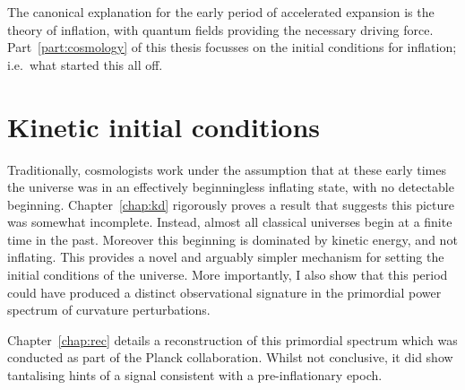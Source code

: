 The canonical explanation for the early period of accelerated expansion is the theory of inflation, with quantum fields providing the necessary driving force. Part~\ref{part:cosmology} of this thesis focusses on the initial conditions for inflation; i.e.\ what started this all off.

\section{Kinetic initial conditions}

Traditionally, cosmologists work under the assumption that at these early times the universe was in an effectively beginningless inflating state, with no detectable beginning. Chapter~\ref{chap:kd} rigorously proves a result that suggests this picture was somewhat incomplete.  Instead, almost all classical universes begin at a finite time in the past.  Moreover this beginning is dominated by kinetic energy, and not inflating. This provides a novel and arguably simpler mechanism for setting the initial conditions of the universe. More importantly, I also show that this period could have produced a distinct observational signature in the primordial power spectrum of curvature perturbations.

Chapter~\ref{chap:rec} details a reconstruction of this primordial spectrum which was conducted as part of the Planck collaboration. Whilst not conclusive, it did show tantalising hints of a signal consistent with a pre-inflationary epoch.

